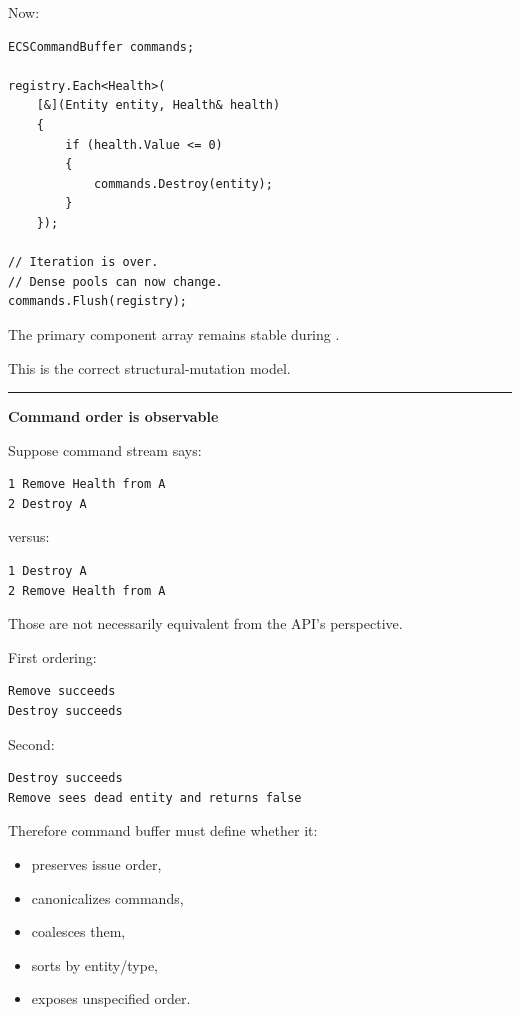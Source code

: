 Now:

\begin{verbatim}
ECSCommandBuffer commands;

registry.Each<Health>(
    [&](Entity entity, Health& health)
    {
        if (health.Value <= 0)
        {
            commands.Destroy(entity);
        }
    });

// Iteration is over.
// Dense pools can now change.
commands.Flush(registry);
\end{verbatim}

The primary component array remains stable during .

This is the correct structural-mutation model.

\begin{center}\rule{0.5\linewidth}{0.5pt}\end{center}

\textbf{Command order is observable}

Suppose command stream says:

\begin{verbatim}
1 Remove Health from A
2 Destroy A
\end{verbatim}

versus:

\begin{verbatim}
1 Destroy A
2 Remove Health from A
\end{verbatim}

Those are not necessarily equivalent from the API's perspective.

First ordering:

\begin{verbatim}
Remove succeeds
Destroy succeeds
\end{verbatim}

Second:

\begin{verbatim}
Destroy succeeds
Remove sees dead entity and returns false
\end{verbatim}

Therefore command buffer must define whether it:

\begin{itemize}
\tightlist
\item
  preserves issue order,
\item
  canonicalizes commands,
\item
  coalesces them,
\item
  sorts by entity/type,
\item
  exposes unspecified order.
\end{itemize}

